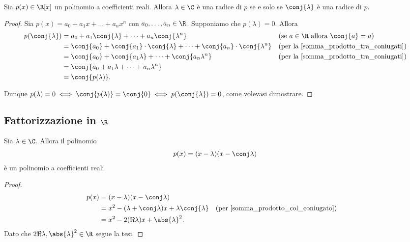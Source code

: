 \begin{proposition}\label{radici_coniugate_a_due_a_due}
    Sia $p(x) \in \R[x]$ un polinomio a coefficienti reali. Allora $\lambda \in \C$ è una radice di $p$ se e solo se $\conj{\lambda}$ è una radice di $p$.
\end{proposition}
\begin{proof}
    Sia $p(x) = a_0 + a_1x + \dots + a_nx^n$ con $a_0, \dots, a_n \in \R$. Supponiamo che $p(\lambda) = 0$. Allora \begin{align*}
        p(\conj{\lambda}) &= a_0 + a_1\conj{\lambda} + \dots + a_n\conj{\lambda^n} &&\text{(se $a \in \R$ allora $\conj{a} = a$)}\\
        &= \conj{a_0} + \conj{a_1}\cdot\conj{\lambda} + \dots + \conj{a_n}\cdot\conj{\lambda^n} &&\text{(per la \ref{somma_prodotto_tra_coniugati})}\\
        &= \conj{a_0} + \conj{a_1\lambda} + \dots + \conj{a_n\lambda^n} &&\text{(per la \ref{somma_prodotto_tra_coniugati})}\\
        &= \conj{a_0 + a_1\lambda + \dots + a_n\lambda^n} \\
        &= \conj{p(\lambda)}.
    \end{align*}

    Dunque $p(\lambda) = 0 \iff \conj{p(\lambda)} = \conj{0} \iff p(\conj{\lambda}) = 0$, come volevasi dimostrare.
\end{proof}

\subsection{Fattorizzazione in $\R$}

\begin{lemma}\label{(x-l)(x-conj(l))_in_R}
    Sia $\lambda \in \C$. Allora il polinomio \[
        p(x) = (x-\lambda)(x-\conj\lambda)    
    \] è un polinomio a coefficienti reali.
\end{lemma}
\begin{proof}
    \begin{align*}
        p(x) &= (x-\lambda)(x-\conj\lambda)\\
        &= x^2 - (\lambda + \conj\lambda)x + \lambda\conj{\lambda} &&\text{(per \ref{somma_prodotto_col_coniugato})}\\
        &= x^2 - 2(\Re \lambda)x + \abs{\lambda}^2.
    \end{align*}
    Dato che $2\Re \lambda, \abs{\lambda}^2 \in \R$ segue la tesi.
\end{proof}


